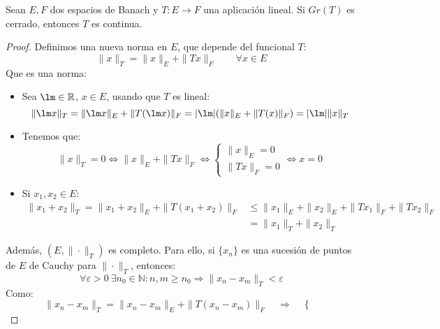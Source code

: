 \begin{teo}
    Sean $E,F$ dos espacios de Banach y $T:E\to F$ una aplicación lineal. Si $Gr(T)$ es cerrado, entonces $T$ es continua.
    \begin{proof}
        Definimos una nueva norma en $E$, que depende del funcional $T$:
        \begin{equation*}
            \|x\|_T = \|x\|_E + \|Tx\|_F \qquad \forall x\in E
        \end{equation*}
        Que es una norma:
        \begin{itemize}
            \item Sea $\lm\in \mathbb{R}$, $x\in E$, usando que $T$ es lineal:
                \begin{equation*}
                    \|\lm x\|_T = \|\lm x\|_E + \|T(\lm x)\|_F = |\lm| (\|x\|_E + \|T(x)\|_F) = |\lm| \|x\|_T
                \end{equation*}
            \item Tenemos que:
                \begin{equation*}
                    \|x\|_T = 0 \Longleftrightarrow \|x\|_E + \|Tx\|_F \Longleftrightarrow \left\{\begin{array}{l}
                        \|x\|_E = 0 \\
                        \|Tx\|_F = 0
                    \end{array}\right. \Longleftrightarrow x = 0
                \end{equation*}
            \item Si $x_1,x_2\in E$:
                \begin{align*}
                    \|x_1 + x_2\|_T = \|x_1 + x_2\|_E + \|T(x_1+x_2)\|_F &\leq \|x_1\|_E + \|x_2\|_E + \|Tx_1\|_F + \|Tx_2\|_F \\
                                    &= \|x_1\|_T + \|x_2\|_T
                \end{align*}
        \end{itemize}
        Además, $(E,\|\cdot \|_T)$ es completo. Para ello, si $\{x_n\}$ es una sucesión de puntos de $E$ de Cauchy para $\|\cdot \|_T$, entonces:
        \begin{equation*}
            \forall \varepsilon>0~\exists n_0\in \mathbb{N} : n,m\geq n_0 \Longrightarrow \|x_n-x_m\|_T < \varepsilon
        \end{equation*}
        Como:
        \begin{equation*}
            \|x_n - x_m\|_T = \|x_n - x_m\|_E + \|T(x_n - x_m)\|_F \quad \Longrightarrow \quad  \left\{\begin{array}{l}

\end{array}
\end{equation*}
\end{proof}
\end{teo}
